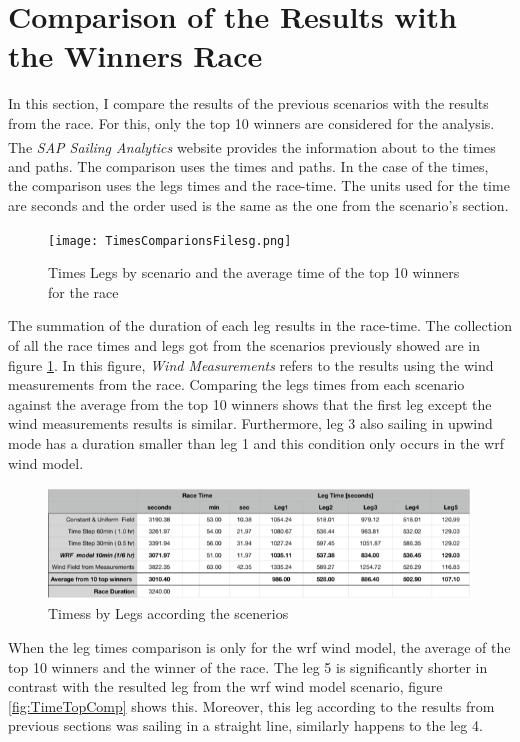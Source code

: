 \section{Comparison of the Results with the Winners Race}

In this section,  I compare the results of the previous scenarios with the results from the race. For this, only the top 10 winners are considered for the analysis. The \textit{SAP Sailing Analytics}\textsuperscript{\textregistered} website provides the information about to the times and paths. The comparison uses the times and paths. In the case of the times, the comparison uses the legs times and the race-time. The units used for the time are seconds and the order used is the same as the one from the scenario's section.\par 

\begin{figure}[htb!] 
    \centering
    \texttt{[image: TimesComparionsFilesg.png]}
    \caption{Times Legs by scenario and the average time of the top 10 winners for the race}
    \label{fig:TimeLegs}
\end{figure}

The summation of the duration of each leg results in the race-time. The collection of all the race times and legs got from the scenarios previously showed are in figure \ref{fig:TimeLegs}. In this figure, \textit{Wind Measurements} refers to the results using the wind measurements from the race. Comparing the legs times from each scenario against the average from the top 10 winners shows that the first leg except the wind measurements results is similar. Furthermore, leg 3 also sailing in upwind mode has a duration smaller than leg 1 and this condition only occurs in the \acrshort{wrf} wind model. \par 

\begin{figure}[htb!] 
    \centering
    \includegraphics{images/TimesLEGS_Race.png}
    \caption{Timess by Legs according the scenerios}
    \label{fig:timesLegs_Sce}
\end{figure}

When the leg times comparison is only for the \acrshort{wrf} wind model, the average of the top 10 winners and the winner of the race. The leg 5 is significantly shorter in contrast with the resulted leg from the \acrshort{wrf} wind model scenario, figure \ref{fig:TimeTopComp} shows this. Moreover, this leg according to the results from previous sections was sailing in a straight line, similarly happens to the leg 4. \par 

